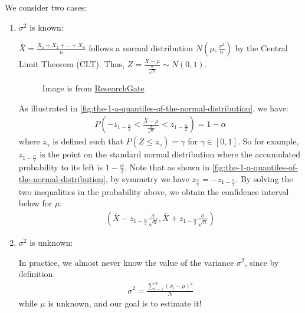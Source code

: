 We consider two cases:
\begin{enumerate}
    \item \( \sigma^2 \) is known:
    
    \( \bar{X} = \frac{X_1 + X_2 + \ldots + X_n}{n} \) follows a normal distribution \( N(\mu, \frac{\sigma^2}{n}) \) by the Central Limit Theorem (CLT).
    Thus, \( Z = \frac{\bar{X} - \mu}{\frac{\sigma}{\sqrt{n}}} \sim N(0, 1) \).
    \begin{figure}[t]
    \begin{center}
    \end{center}
    \caption{Image is from \href{https://www.researchgate.net/figure/The-1-a-quantiles-of-the-normal-distribution_fig2_273257392}{ResearchGate}}
    \label{fig:the-1-a-quantiles-of-the-normal-distribution}
    \end{figure}
    As illustrated in \autoref{fig:the-1-a-quantiles-of-the-normal-distribution}, we have:
    \begin{gather*}
        P(-z_{1 - \frac{\alpha}{2}} < \frac{\bar{X} - \mu}{\frac{\sigma}{\sqrt{n}}} < z_{1 - \frac{\alpha}{2}}) = 1 - \alpha
    \end{gather*}
    where \( z_\gamma \) is defined such that \( P(Z \leq z_\gamma) = \gamma \) for \( \gamma \in [0, 1] \).
    So for example, \( z_{1 - \frac{\alpha}{2}} \) is the point on the standard normal distribution where the accumulated probability to its left is \( 1 - \frac{\alpha}{2} \).
    Note that as shown in \autoref{fig:the-1-a-quantiles-of-the-normal-distribution}, by symmetry we have  \( z_{\frac{\alpha}{2}} = -z_{1 - \frac{\alpha}{2}} \).
    By solving the two inequalities in the probability above, we obtain the confidence interval below for \( \mu \):
    \begin{gather*}
        (\bar{X} - z_{1 - \frac{\alpha}{2}}\frac{\sigma}{\sqrt{n}}, \bar{X} + z_{1 - \frac{\alpha}{2}}\frac{\sigma}{\sqrt{n}})
    \end{gather*}
    \item \( \sigma^2 \) is unknown:
    
    In practice, we almost never know the value of the variance \( \sigma^2 \), since by definition:
    \begin{gather*}
        \sigma^2 = \frac{\sum_{i = 1}^{N}(x_i - \mu)^2}{N}
    \end{gather*}
    while \( \mu \) is unknown, and our goal is to estimate it!


\end{enumerate}
